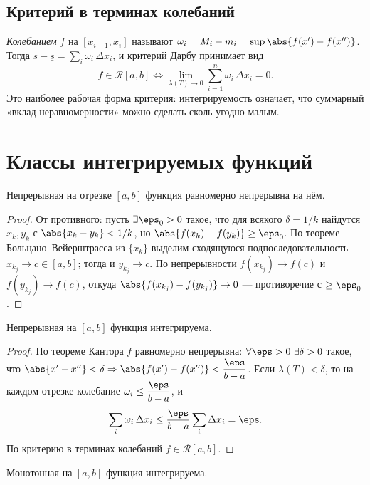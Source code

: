 \subsection{Критерий в терминах колебаний}

\emph{Колебанием} $f$ на $[x_{i-1},x_i]$ называют $\omega_i=M_i-m_i=\sup\abs{f(x')-f(x'')}$. Тогда
$\overline s-\underline s=\sum_i\omega_i\,\Delta x_i$, и критерий Дарбу принимает вид
\[
  f\in\mathcal R[a,b]\iff \lim_{\lambda(T)\to0}\sum_{i=1}^n \omega_i\,\Delta x_i=0 .
\]
Это наиболее рабочая форма критерия: интегрируемость означает, что суммарный «вклад
неравномерности» можно сделать сколь угодно малым.

\section{Классы интегрируемых функций}

\begin{theorem}[Кантор]
Непрерывная на отрезке $[a,b]$ функция равномерно непрерывна на нём.
\end{theorem}

\begin{proof}
От противного: пусть $\exists\eps_0>0$ такое, что для всякого $\delta=1/k$ найдутся
$x_k,y_k$ с $\abs{x_k-y_k}<1/k$, но $\abs{f(x_k)-f(y_k)}\ge\eps_0$. По теореме
Больцано–Вейерштрасса из $\{x_k\}$ выделим сходящуюся подпоследовательность $x_{k_j}\to c\in[a,b]$;
тогда и $y_{k_j}\to c$. По непрерывности $f(x_{k_j})\to f(c)$ и $f(y_{k_j})\to f(c)$, откуда
$\abs{f(x_{k_j})-f(y_{k_j})}\to0$ — противоречие с $\ge\eps_0$.
\end{proof}

\begin{theorem}
Непрерывная на $[a,b]$ функция интегрируема.
\end{theorem}

\begin{proof}
По теореме Кантора $f$ равномерно непрерывна: $\forall\eps>0\ \exists\delta>0$ такое, что
$\abs{x'-x''}<\delta\Rightarrow\abs{f(x')-f(x'')}<\dfrac{\eps}{b-a}$. Если $\lambda(T)<\delta$, то
на каждом отрезке колебание $\omega_i\le\dfrac{\eps}{b-a}$, и
\[
  \sum_i\omega_i\,\Delta x_i\le\frac{\eps}{b-a}\sum_i\Delta x_i=\eps .
\]
По критерию в терминах колебаний $f\in\mathcal R[a,b]$.
\end{proof}

\begin{theorem}
Монотонная на $[a,b]$ функция интегрируема.
\end{theorem}

